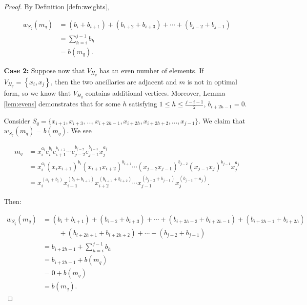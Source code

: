 \documentclass[12pt]{amsart}
\def\set#1{\left\{ {#1} \right\}}
\renewcommand{\leq}{\leqslant}
\theoremstyle{plain}
\theoremstyle{definition}
\begin{document}
\begin{proof}
By Definition \ref{defn:weights}, %

\begin{align*}
w_{S_q}(m_q) &= (b_i+b_{i+1}) + (b_{i+2}+b_{i+3}) + \cdots + (b_{j-2}+b_{j-1})\\
&= \sum\limits_{h = i}^{j-1} b_h\\
&= b(m_q).
\end{align*}


\textbf{Case 2:} Suppose now that $V_{H_q}$ has an even number of elements. If $V_{H_q} = \set{x_i,x_j}$, then the two ancillaries are adjacent and $m$ is not in optimal form, so we know that $V_{H_q}$ contains additional vertices. %
Moreover, Lemma \ref{lem:evens} demonstrates that for some $h$ satisfying $1 \leq h \leq \frac{j-i-1}{2}$, $b_{i+2h-1} = 0$. 
 
 Consider $S_q = \{x_{i+1}, x_{i+3}, \ldots, x_{i+2h-1}, x_{i+2h}, x_{i+2h+2}, \ldots,x_{j-1}\}$. We claim that $w_{S_q}(m_q) = b(m_q)$.
We see

\begin{align*}
m_q &= x_i^{a_i} e_{i}^{b_i} e_{i+1}^{b_{i+1}} \cdots e_{j-2}^{b_{j-2}}e_{j-1}^{b_{j-1}} x_{j}^{a_{j}}\\
&= x_i^{a_i} (x_{i} x_{i+1})^{b_i} (x_{i+1} x_{i+2})^{b_{i+1}} \cdots (x_{j-2}x_{j-1})^{b_{j-2}}(x_{j-1} x_j)^{b_{j-1}} x_{j}^{a_{j}}\\
&= x_i^{(a_i + b_i)} x_{i+1}^{(b_{i} + b_{i+1})} x_{i+2}^{(b_{i+1} + b_{i+2})} \cdots x_{j-1}^{(b_{j-2} + b_{j-1})} x_{j}^{(b_{j-1} + a_{j})}.
\end{align*}

Then:

\begin{align*}
w_{S_q}(m_q) &= (b_i+b_{i+1}) + (b_{i+2}+b_{i+3}) + \cdots + (b_{i+2h-2}+b_{i+2h-1}) + (b_{i+2h-1} + b_{i+2h}) \\
&\hspace{1cm} + (b_{i+2h+1}+b_{i+2h+2}) + \cdots + (b_{j-2}+b_{j-1})\\
&= b_{i+2h-1} +  \sum\limits_{h = i}^{j-1} b_h\\
&= b_{i+2h-1} + b(m_q) \\
&= 0 + b(m_q) \\
&= b(m_q).
\end{align*}


\end{proof}
\end{document}
